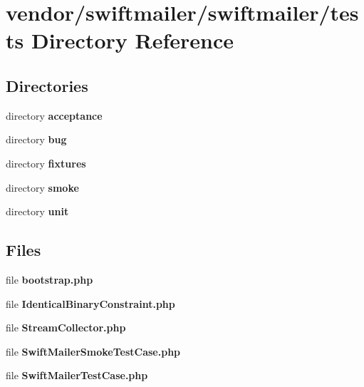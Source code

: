 \section{vendor/swiftmailer/swiftmailer/tests Directory Reference}
\label{dir_5d4bb45eb58f5de3321ae402ccc27d0b}
\subsection*{Directories}
\begin{DoxyCompactItemize}
\item 
directory {\bf acceptance}
\item 
directory {\bf bug}
\item 
directory {\bf fixtures}
\item 
directory {\bf smoke}
\item 
directory {\bf unit}
\end{DoxyCompactItemize}
\subsection*{Files}
\begin{DoxyCompactItemize}
\item 
file {\bf bootstrap.\+php}
\item 
file {\bf Identical\+Binary\+Constraint.\+php}
\item 
file {\bf Stream\+Collector.\+php}
\item 
file {\bf Swift\+Mailer\+Smoke\+Test\+Case.\+php}
\item 
file {\bf Swift\+Mailer\+Test\+Case.\+php}
\end{DoxyCompactItemize}
